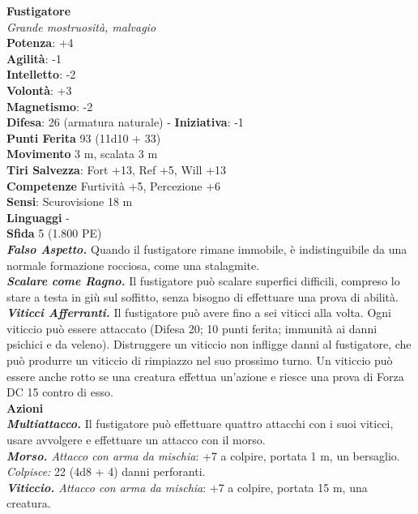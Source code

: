 \begin{multicols}{2}
\medskip\textbf{Fustigatore}\\
\emph{Grande mostruosità, malvagio}\\
\textbf{Potenza}: +4\\
\textbf{Agilità}: -1\\
\textbf{Intelletto}: -2\\
\textbf{Volontà}: +3\\
\textbf{Magnetismo}: -2\\
\textbf{Difesa}: 26 (armatura naturale) - \textbf{Iniziativa}: -1\\
\textbf{Punti Ferita} 93 (11d10 + 33)\\
\textbf{Movimento} 3 m, scalata 3 m\\
\textbf{Tiri Salvezza}: Fort +13, Ref +5, Will +13\\
\textbf{Competenze} Furtività +5, Percezione +6\\
\textbf{Sensi}: Scurovisione 18 m\\
\textbf{Linguaggi} -\\
\textbf{Sfida} 5 (1.800 PE)\smallskip\\
\emph{\textbf{Falso Aspetto.}} Quando il fustigatore rimane immobile, è indistinguibile da una normale formazione rocciosa, come una stalagmite.\\
\emph{\textbf{Scalare come Ragno.}} Il fustigatore può scalare superfici difficili, compreso lo stare a testa in giù sul soffitto, senza bisogno di effettuare una prova di abilità.\\
\emph{\textbf{Viticci Afferranti.}} Il fustigatore può avere fino a sei viticci alla volta. Ogni viticcio può essere attaccato (Difesa 20; 10 punti ferita; immunità ai danni psichici e da veleno). Distruggere un viticcio non infligge danni al fustigatore, che può produrre un viticcio di rimpiazzo nel suo prossimo turno. Un viticcio può essere anche rotto se una creatura effettua un'azione e riesce una prova di Forza DC 15 contro di esso.\\
\smallskip\textbf{Azioni}\\
\emph{\textbf{Multiattacco.}} Il fustigatore può effettuare quattro attacchi con i suoi viticci, usare avvolgere e effettuare un attacco con il morso.\\
\emph{\textbf{Morso.} Attacco con arma da mischia}: +7 a colpire, portata 1 m, un bersaglio.\\
\emph{Colpisce:} 22 (4d8 + 4) danni perforanti.\\
\emph{\textbf{Viticcio.} Attacco con arma da mischia}: +7 a colpire, portata 15 m, una creatura.\\

\end{multicols}
